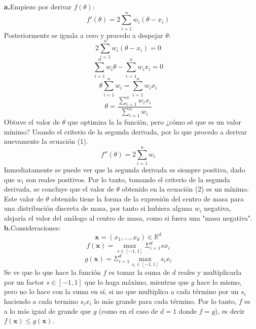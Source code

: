 \documentclass[14pt,a4paper]{report}
\begin{document}
\textbf{a.}\quad Empiezo por derivar $f(\theta)$:
\begin{equation}
f'(\theta)=2\sum_{i=1}^{n}w_i(\theta-x_i)
\end{equation}
Posteriormente se iguala a cero y procedo a despejar $\theta$:
\begin{equation*}
2\sum_{i=1}^{n}w_i(\theta-x_i)=0
\end{equation*}
\begin{equation*}
\sum_{i=1}^{n}w_i\theta-\sum_{i=1}^{n}w_ix_i=0
\end{equation*}
\begin{equation*}
\theta\sum_{i=1}^{n}w_i=\sum_{i=1}^{n}w_ix_i
\end{equation*}  
\begin{equation}
\theta=\frac{\sum_{i=1}^{n}w_ix_i}{\sum_{i=1}^{n}w_i}
\end{equation} 
Obtuve el valor de $\theta$ que optimiza la la función, pero ¿cómo sé que es un valor mínimo? Usando el criterio de la segunda derivada, por lo que procedo a derivar nuevamente la ecuación (1).
\begin{equation}
f''(\theta)=2\sum_{i=1}^{n}w_i
\end{equation}
Inmediatamente se puede ver que la segunda derivada es siempre positiva, dado que $w_i$ son reales positivos. Por lo tanto, tomando el criterio de la segunda derivada, se concluye que el valor de $\theta$ obtenido en la ecuación (2) es un mínimo.\\
Este valor de $\theta$ obtenido tiene la forma de la expresión del centro de masa para una distribución discreta de masa, por tanto si hubiera alguna $w_i$ negativa, alejaría el valor del análogo al centro de masa, como si fuera una "masa negativa".\\
\textbf{b.}\quad Consideraciones:\\
\begin{equation}
\mathbf{x}=(x_1,...,x_d)\in\mathbb{R}^d
\end{equation}
\begin{equation}
f(\mathbf{x})=\max_{s\in [-1,1]}\Sigma_{i=1}^{d}sx_i
\end{equation}
\begin{equation}
g(\mathbf{x})=\Sigma_{i=1}^{d}\max_{s_i\in [-1,1]}s_ix_i
\end{equation}
Se ve que lo que hace la función $f$ es tomar la suma de $d$ reales y multiplicarla por un factor $s\in[-1,1]$ que lo haga máximo, mientras que $g$ hace lo mismo, pero no lo hace con la suma en sí, si no que multiplica a cada término por un $s_i$ haciendo a cada termino $s_ix_i$ lo más grande para cada término. Por lo tanto, $f$ es a lo más igual de grande que $g$ (como en el caso de $d=1$ donde $f=g$), es decir $f(\mathbf{x})\leq g(\mathbf{x})$.\\
\end{document}
